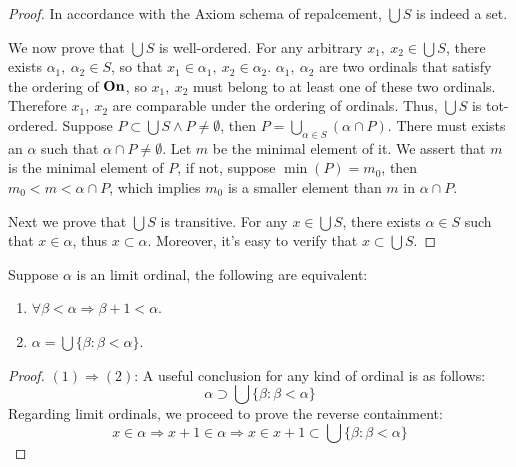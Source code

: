 \begin{proof}
  In accordance with the Axiom schema of repalcement, $\bigcup S$ is indeed a set. 

  We now prove that $\bigcup S$ is well-ordered. For any arbitrary $x_1,\ x_2 \in \bigcup S$, there exists $\alpha_1,\ \alpha_2 \in S$, so that $x_1 \in \alpha_1, \ x_2 \in \alpha_2$. 
  $\alpha_1,\ \alpha_2$ are two ordinals that satisfy the ordering of $\boldsymbol{\mathrm{On}}$, so $x_1, \ x_2$ must belong to at least one of these two ordinals. Therefore $x_1, \ x_2$ are comparable under the ordering of ordinals. Thus, $\bigcup S$ is tot-ordered. Suppose $P \subset \bigcup S \wedge P \neq \emptyset $, then $P = \bigcup_{\alpha \in S} (\alpha \cap P)$. There must exists an $\alpha$ such that $\alpha \cap P \neq \emptyset$. Let $m$ be the minimal element of it. We assert that $m$ is the minimal element of $P$, if not, suppose $\min(P) = m_0$, then $m_0 < m < \alpha \cap P$, which implies $m_0$ is a smaller element than $m$ in $\alpha \cap P$.
  

  Next we prove that $\bigcup S$ is transitive. For any $x \in \bigcup S$, there exists $\alpha \in S $ such that $x \in \alpha$, thus $x \subset \alpha$. Moreover, it's easy to verify that $x \subset \bigcup S$.
\end{proof}







\begin{corollary}
  Suppose $\alpha$ is an limit ordinal, the following are equivalent:
  \begin{enumerate}
    \item $\forall \beta < \alpha \Rightarrow \beta + 1 < \alpha$.
    \item  $\alpha = \bigcup \{ \beta: \beta < \alpha \}$.
  \end{enumerate}
\end{corollary}

\begin{proof}
  $(1) \Rightarrow (2)$: A useful conclusion for any kind of ordinal is as follows:
  \[
    \alpha \supset \bigcup \{ \beta : \beta < \alpha \}
  \]
  Regarding limit ordinals, we proceed to prove the reverse containment:
  \[
    x \in \alpha \Rightarrow x + 1 \in \alpha \Rightarrow x \in x+1 \subset \bigcup \{ \beta : \beta < \alpha \}
  \]
\end{proof}







